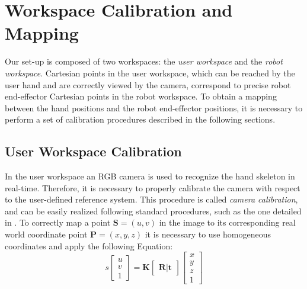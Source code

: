 \documentclass[letterpaper, 10 pt, conference]{ieeeconf}  %
\begin{document}
\section{Workspace Calibration and Mapping} \label{sec:calib}


Our set-up is composed of two workspaces: the \textit{user workspace} and the \textit{robot workspace}. Cartesian points in the user workspace, which can be reached by the user hand and are correctly viewed by the camera, correspond to precise robot end-effector Cartesian points in the robot workspace. To obtain a mapping between the hand positions and the robot end-effector positions, it is necessary to perform a set of calibration procedures described in the following sections.

\subsection{User Workspace Calibration}
In the user workspace an RGB camera is used to recognize the hand skeleton in real-time. Therefore, it is necessary to properly calibrate the camera with respect to the user-defined reference system. This procedure is called \textit{camera calibration}, and can be easily realized following standard procedures, such as the one detailed in \cite{MatlabCameraCalib}.
To correctly map a point $\mathbf{S} = (u,v)$ in the image to its corresponding real world coordinate point $\mathbf{P} = (x,y,z)$ it is necessary to use homogeneous coordinates and apply the following Equation:
\begin{equation}
s 
  \begin{bmatrix}
    u \\
    v \\
    1
  \end{bmatrix}
 =
\mathbf{K}
  \begin{bmatrix}
    \mathbf{R} | \mathbf{t}
  \end{bmatrix}
  \begin{bmatrix}
    x \\
    y \\
    z \\
    1
  \end{bmatrix}
\label{eq1}
\end{equation}
\end{document}

